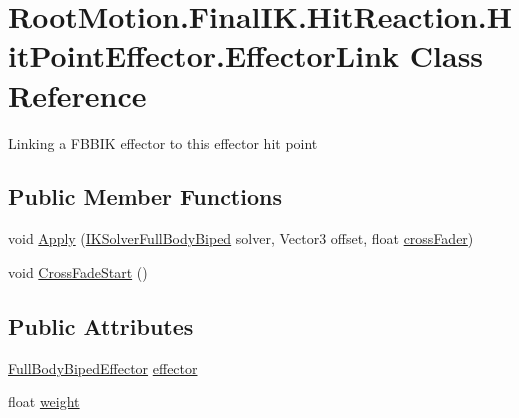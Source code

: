 \hypertarget{class_root_motion_1_1_final_i_k_1_1_hit_reaction_1_1_hit_point_effector_1_1_effector_link}{}\section{Root\+Motion.\+Final\+I\+K.\+Hit\+Reaction.\+Hit\+Point\+Effector.\+Effector\+Link Class Reference}
\label{class_root_motion_1_1_final_i_k_1_1_hit_reaction_1_1_hit_point_effector_1_1_effector_link}


Linking a F\+B\+B\+IK effector to this effector hit point  


\subsection*{Public Member Functions}
\begin{DoxyCompactItemize}
\item 
void \mbox{\hyperlink{class_root_motion_1_1_final_i_k_1_1_hit_reaction_1_1_hit_point_effector_1_1_effector_link_ae7abbda1ed3664f3676656b596fbe1e1}{Apply}} (\mbox{\hyperlink{class_root_motion_1_1_final_i_k_1_1_i_k_solver_full_body_biped}{I\+K\+Solver\+Full\+Body\+Biped}} solver, Vector3 offset, float \mbox{\hyperlink{class_root_motion_1_1_final_i_k_1_1_hit_reaction_1_1_hit_point_a8cadd9b801baa420624e09bb44664648}{cross\+Fader}})
\item 
void \mbox{\hyperlink{class_root_motion_1_1_final_i_k_1_1_hit_reaction_1_1_hit_point_effector_1_1_effector_link_a60a1745a2047c6418433f4c8482d4d67}{Cross\+Fade\+Start}} ()
\end{DoxyCompactItemize}
\subsection*{Public Attributes}
\begin{DoxyCompactItemize}
\item 
\mbox{\hyperlink{namespace_root_motion_1_1_final_i_k_ae0dd2058c7667b6f132c11a6b860c14a}{Full\+Body\+Biped\+Effector}} \mbox{\hyperlink{class_root_motion_1_1_final_i_k_1_1_hit_reaction_1_1_hit_point_effector_1_1_effector_link_a5c1877206df981e00b672464704e0afb}{effector}}
\item 
float \mbox{\hyperlink{class_root_motion_1_1_final_i_k_1_1_hit_reaction_1_1_hit_point_effector_1_1_effector_link_a9e1586b49a9262d8b0ec7e33ccfecbd8}{weight}}
\end{DoxyCompactItemize}


